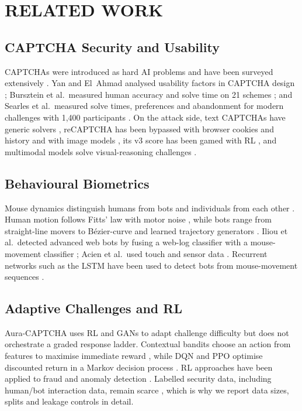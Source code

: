 \documentclass{ieeetj}
\begin{document}
\section{RELATED WORK}
\subsection{CAPTCHA Security and Usability}
CAPTCHAs were introduced as hard AI problems \cite{von_2003} and have been surveyed extensively \cite{guerar2021,umar_2022}. Yan and El~Ahmad analysed usability factors in CAPTCHA design \cite{yan2008captcha}; Bursztein et al.\ measured human accuracy and solve time on 21 schemes \cite{bursztein_humans_2010}; and Searles et al.\ measured solve times, preferences and abandonment for modern challenges with 1{,}400 participants \cite{captcha_study_2023}. On the attack side, text CAPTCHAs have generic solvers \cite{bursztein2014new}, reCAPTCHA has been bypassed with browser cookies and history \cite{sivakorn_recaptcha_2016} and with image models \cite{plesner2024yolo}, its v3 score has been gamed with RL \cite{akrout2019}, and multimodal models solve visual-reasoning challenges \cite{qi2026,wu2025mca_bench}.

\vspace{-5pt}
\subsection{Behavioural Biometrics}
Mouse dynamics distinguish humans from bots \cite{bezier_bots_2022,iliou_2021} and individuals from each other \cite{khan_2023,shen_2013}. Human motion follows Fitts' law with motor noise \cite{fittslaw2019}, while bots range from straight-line movers to B\'ezier-curve and learned trajectory generators \cite{bezier2025,bezier_bots_2022,antal_2021_sapi}. Iliou et al.\ detected advanced web bots by fusing a web-log classifier with a mouse-movement classifier \cite{iliou_2021}; Acien et al.\ used touch and sensor data \cite{acien_2021}. Recurrent networks such as the LSTM \cite{hochreiter_lstm_1997} have been used to detect bots from mouse-movement sequences \cite{he_seq_2021}.

\vspace{-5pt}
\subsection{Adaptive Challenges and RL}
Aura-CAPTCHA uses RL and GANs to adapt challenge difficulty \cite{aura_captcha_2025} but does not orchestrate a graded response ladder. Contextual bandits choose an action from features to maximise immediate reward \cite{li_linucb_2010,russo_ts_2018}, while DQN \cite{mnih_dqn_2015} and PPO \cite{schulman_ppo_2017} optimise discounted return in a Markov decision process \cite{sutton2018reinforcement}. RL approaches have been applied to fraud and anomaly detection \cite{cui_2025}. Labelled security data, including human/bot interaction data, remain scarce \cite{mvula_2023}, which is why we report data sizes, splits and leakage controls in detail.
\end{document}
